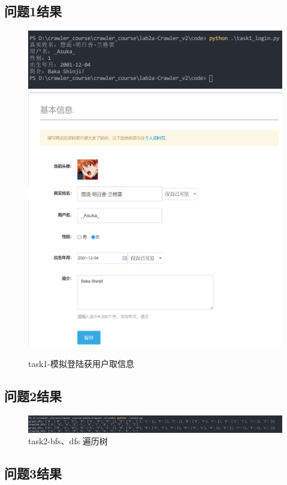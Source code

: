 \documentclass[12pt,a4paper,oneside]{article}
\begin{document}
\subsection{问题1结果}
\begin{figure}[H]
	\includegraphics[scale=0.8]{1.png}
	\includegraphics[scale=0.6]{1_1.png}
	 \caption{task1-模拟登陆获用户取信息}
\end{figure}
\let\cleardoublepage\clearpage
\subsection{问题2结果}
\begin{figure}[H] \centering
	\includegraphics[scale=0.45]{2.png}
	 \caption{task2-bfs、dfs 遍历树}
\end{figure}
\let\cleardoublepage\clearpage
\subsection{问题3结果}
\end{document}
